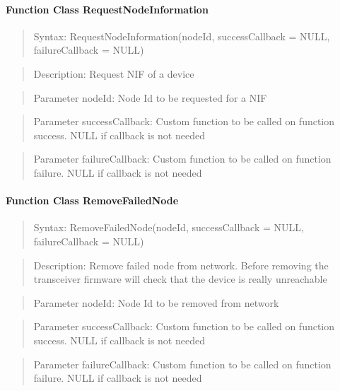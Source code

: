 \paragraph {Function Class RequestNodeInformation}
\begin{quote} Syntax: RequestNodeInformation(nodeId, successCallback = NULL, failureCallback = NULL)\end{quote}
\begin{quote} Description: Request NIF of a device\end{quote}
\begin{quote} Parameter nodeId: Node Id to be requested for a NIF\end{quote}
\begin{quote} Parameter successCallback: Custom function to be called on function success. NULL if callback is not needed\end{quote} 
\begin{quote} Parameter failureCallback: Custom function to be called on function failure. NULL if callback is not needed\end{quote} 

\paragraph {Function Class RemoveFailedNode}
\begin{quote} Syntax: RemoveFailedNode(nodeId, successCallback = NULL, failureCallback = NULL)\end{quote}
\begin{quote} Description: Remove failed node from network. Before removing the transceiver firmware will check that the device is really unreachable\end{quote}
\begin{quote} Parameter nodeId: Node Id to be removed from network\end{quote}
\begin{quote} Parameter successCallback: Custom function to be called on function success. NULL if callback is not needed\end{quote} 
\begin{quote} Parameter failureCallback: Custom function to be called on function failure. NULL if callback is not needed\end{quote} 

